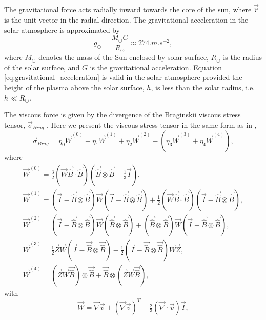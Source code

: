 The gravitational force acts radially inward towards the core of the sun, where $\vec{\hat{r}}$ is the unit vector in the radial direction. The gravitational acceleration in the solar atmosphere is approximated by
\begin{equation}
    \label{eq:gravitational_acceleration}
    g_\odot=\frac{M_\odot G}{R_\odot}\approx274\si{.m.s^{-2}},
\end{equation}
where $M_\odot$ denotes the mass of the Sun enclosed by solar surface, $R_\odot$ is the radius of the solar surface, and $G$ is the gravitational acceleration. Equation \eqref{eq:gravitational_acceleration} is valid in the solar atmosphere provided the height of the plasma above the solar surface, $h$, is less than the solar radius, i.e. $h\ll R_\odot$.

The viscous force is given by the divergence of the Braginskii viscous stress tensor, $\vec{\sigma}_{Brag}$ \citep{Braginskii1965}. Here we present the viscous stress tensor in the same form as in \citet{MacTaggart2017},
\begin{equation}
    \label{eq:braginskii_viscous_stress_tensor}
    \vec{\sigma}_{Brag}=\eta_0\vec{W}^{(0)}+\eta_1\vec{W}^{(1)}+\eta_2\vec{W}^{(2)}
    -(\eta_3\vec{W}^{(3)}+\eta_4\vec{W}^{(4)}),
\end{equation}
where
\begin{gather}
    \vec{W}^{(0)}=\tfrac{3}{2}(\vec{W}\vec{\hat{B}}\cdot\vec{\hat{B}})(\vec{\hat{B}}\otimes\vec{\hat{B}}-\tfrac{1}{3}\vec{I}),\\
    \vec{W}^{(1)}=(\vec{I}-\vec{\hat{B}}\otimes\vec{\hat{B}})\vec{W}(\vec{I}-\vec{\hat{B}}\otimes\vec{\hat{B}})
    +\tfrac{1}{2}(\vec{W}\vec{\hat{B}}\cdot\vec{\hat{B}})(\vec{I}-\vec{\hat{B}}\otimes\vec{\hat{B}}),\\
    \vec{W}^{(2)}=(\vec{I}-\vec{\hat{B}}\otimes\vec{\hat{B}})\vec{W}(\vec{\hat{B}}\otimes\vec{\hat{B}})+(\vec{\hat{B}}\otimes\vec{\hat{B}})\vec{W}(\vec{I}-\vec{\hat{B}}\otimes\vec{\hat{B}}),\\
    \vec{W}^{(3)}=\tfrac{1}{2}\vec{Z}\vec{W}(\vec{I}-\vec{\hat{B}}\otimes\vec{\hat{B}})-\tfrac{1}{2}(\vec{I}-\vec{\hat{B}}\otimes\vec{\hat{B}})\vec{W}\vec{Z}, \\
    \vec{W}^{(4)}=(\vec{Z}\vec{W}\vec{\hat{B}})\otimes\vec{\hat{B}}+\vec{\hat{B}}\otimes(\vec{Z}\vec{W}\vec{\hat{B}}),
\end{gather}
with 
\begin{equation}
    \vec{W}=\vec{\nabla}\vec{v}+(\vec{\nabla}\vec{v})^T-\tfrac{2}{3}(\vec{\nabla}\cdot\vec{v})\vec{I},
\end{equation}
